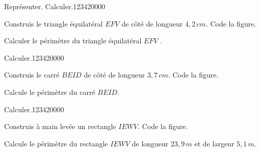 \begin{pageAD} 

 
\begin{ExoCad}{Représenter. Calculer.}{1234}{2}{0}{0}{0}{0}

 \begin{minipage}{.48\linewidth}
 
Construis le  triangle équilatéral $EFV$  de côté de longueur  $4,2\,cm$. Code la figure.

\vspace{5cm}
 \end{minipage}
 \hfill
 \begin{minipage}{.38\linewidth}
Calculer le périmètre  du triangle équilatéral $EFV$ . 
 \end{minipage}
 \end{ExoCad} 
 
\begin{ExoCad}{Calculer.}{1234}{2}{0}{0}{0}{0}

 \begin{minipage}{.58\linewidth}
Construis le carré $BEID$ de côté de longueur $3,7\,cm$. Code la figure.

\vspace{5cm}
 \end{minipage} \hfill
 \begin{minipage}{.48\linewidth}
Calcule le périmètre du carré $BEID$. 

 \end{minipage}
 
\end{ExoCad} 
  
\begin{ExoCad}{Calculer.}{1234}{2}{0}{0}{0}{0}

\begin{minipage}{.38\linewidth}
 
Construis à main levée un rectangle $IEWV$. Code la figure.

\vspace{5cm}
 \end{minipage} \hfill
 \begin{minipage}{.58\linewidth}
Calcule le périmètre du rectangle $IEWV$ de longueur $23,9\,m$ et de largeur $5,1\,m$. 

\end{minipage}

\end{ExoCad} 
  
\end{pageAD} 
